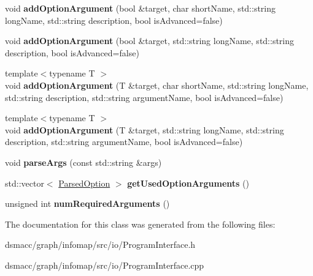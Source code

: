 \begin{DoxyCompactItemize}
\item 
\mbox{\label{classProgramInterface_a918b5aa0d9ac1223241757573afe610a}} 
void {\bfseries add\+Option\+Argument} (bool \&target, char short\+Name, std\+::string long\+Name, std\+::string description, bool is\+Advanced=false)
\item 
\mbox{\label{classProgramInterface_a0dd09e2fa92b87a760275e07b73f13dd}} 
void {\bfseries add\+Option\+Argument} (bool \&target, std\+::string long\+Name, std\+::string description, bool is\+Advanced=false)
\item 
\mbox{\label{classProgramInterface_a7dc981bbd338419999768aceceefc3e4}} 
{\footnotesize template$<$typename T $>$ }\\void {\bfseries add\+Option\+Argument} (T \&target, char short\+Name, std\+::string long\+Name, std\+::string description, std\+::string argument\+Name, bool is\+Advanced=false)
\item 
\mbox{\label{classProgramInterface_a6d9673650514edbb9473b2447161d544}} 
{\footnotesize template$<$typename T $>$ }\\void {\bfseries add\+Option\+Argument} (T \&target, std\+::string long\+Name, std\+::string description, std\+::string argument\+Name, bool is\+Advanced=false)
\item 
\mbox{\label{classProgramInterface_a0ca4ca902cc30ea4bffe78d7919b46f5}} 
void {\bfseries parse\+Args} (const std\+::string \&args)
\item 
\mbox{\label{classProgramInterface_a09da1351fb5c563c63d98c229779ff4e}} 
std\+::vector$<$ \mbox{\hyperlink{structParsedOption}{Parsed\+Option}} $>$ {\bfseries get\+Used\+Option\+Arguments} ()
\item 
\mbox{\label{classProgramInterface_accda7856d59556569d00645087d0099d}} 
unsigned int {\bfseries num\+Required\+Arguments} ()
\end{DoxyCompactItemize}


The documentation for this class was generated from the following files\+:\begin{DoxyCompactItemize}
\item 
dsmacc/graph/infomap/src/io/Program\+Interface.\+h\item 
dsmacc/graph/infomap/src/io/Program\+Interface.\+cpp\end{DoxyCompactItemize}
